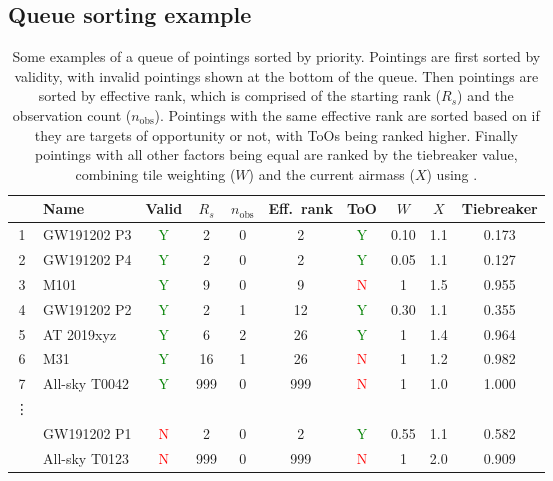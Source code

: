 \subsection{Queue sorting example}
\label{sec:sorting_example}
\begin{colsection}

\begin{table}[t]
    \begin{center}
        \begin{tabular}{c|l|c|ccc|c|ccc} %
            & Name & Valid & $R_s$ & $n_\text{obs}$ & Eff.\ rank & ToO & $W$ & $X$ & Tiebreaker \\
            \midrule
            1 & GW191202 P3   & \textcolor{Green}{Y} &  2  & 0 &   2 & \textcolor{Green}{Y} & 0.10 & 1.1 & 0.173 \\
            2 & GW191202 P4   & \textcolor{Green}{Y} &  2  & 0 &   2 & \textcolor{Green}{Y} & 0.05 & 1.1 & 0.127 \\
            3 &         M101  & \textcolor{Green}{Y} &  9  & 0 &   9 &   \textcolor{Red}{N} &    1 & 1.5 & 0.955 \\
            4 & GW191202 P2   & \textcolor{Green}{Y} &  2  & 1 &  12 & \textcolor{Green}{Y} & 0.30 & 1.1 & 0.355 \\
            5 &   AT 2019xyz  & \textcolor{Green}{Y} &  6  & 2 &  26 & \textcolor{Green}{Y} &    1 & 1.4 & 0.964 \\
            6 &          M31  & \textcolor{Green}{Y} &  16 & 1 &  26 &   \textcolor{Red}{N} &    1 & 1.2 & 0.982 \\
            7 & All-sky T0042 & \textcolor{Green}{Y} & 999 & 0 & 999 &   \textcolor{Red}{N} &    1 & 1.0 & 1.000 \\
            \vdots & & & & & & \\
              &  GW191202 P1  &   \textcolor{Red}{N} &   2 & 0 &   2 & \textcolor{Green}{Y} & 0.55 & 1.1 & 0.582 \\
              & All-sky T0123 &   \textcolor{Red}{N} & 999 & 0 & 999 &   \textcolor{Red}{N} &    1 & 2.0 & 0.909 \\
        \end{tabular}
    \end{center}
    \caption[Examples of sorting pointings by priority]{
        Some examples of a queue of pointings sorted by priority. Pointings are first sorted by validity, with invalid pointings shown at the bottom of the queue. Then pointings are sorted by effective rank, which is comprised of the starting rank ($R_s$) and the observation count ($n_\text{obs}$). Pointings with the same effective rank are sorted based on if they are targets of opportunity or not, with ToOs being ranked higher. Finally pointings with all other factors being equal are ranked by the tiebreaker value, combining tile weighting ($W$) and the current airmass ($X$) using .
    }\label{tab:priority}
\end{table}


\end{colsection}
